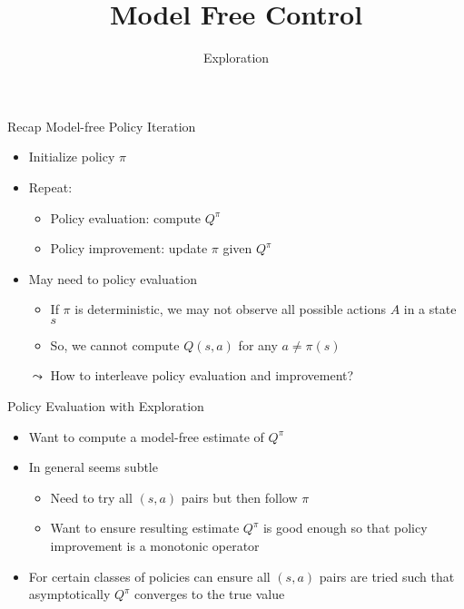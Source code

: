 


\title[RL: Model Free Control]{Model Free Control}
\subtitle{Exploration}




	
	\maketitle

\begin{frame}[c]{Recap Model-free Policy Iteration}
	
	\begin{itemize}
		\item Initialize policy $\pi$
		\item Repeat:
		\begin{itemize}
			\item Policy evaluation: compute $Q^\pi$
			\item Policy improvement: update $\pi$ given $Q^\pi$
		\end{itemize}
		\bigskip
		\pause
		\item May need to policy evaluation 
		\begin{itemize}
			\item If $\pi$ is deterministic, we may not observe all possible actions $A$ in a state $s$
			\item So, we cannot compute $Q(s,a)$ for any $a \neq \pi(s)$
		\end{itemize}
		\pause
		\item[$\leadsto$] How to interleave policy evaluation and improvement?
	\end{itemize}
	
\end{frame}
\begin{frame}[c]{Policy Evaluation with Exploration}
	
	\begin{itemize}
		\item Want to compute a model-free estimate of $Q^\pi$
		\item In general seems subtle
		\begin{itemize}
			\item Need to try all $(s,a)$ pairs but then follow $\pi$
			\item Want to ensure resulting estimate $Q^\pi$ is good enough so that policy
			improvement is a monotonic operator
		\end{itemize}
		\item For certain classes of policies can ensure all $(s,a)$ pairs are tried such
		that asymptotically $Q^\pi$ converges to the true value
	\end{itemize}
	
\end{frame}
